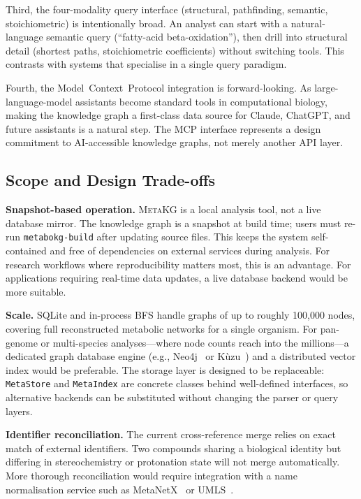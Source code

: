 \documentclass[10pt]{article}
\begin{document}
Third, the four-modality query interface (structural, pathfinding, semantic,
stoichiometric) is intentionally broad. An analyst can start with a
natural-language semantic query (``fatty-acid beta-oxidation''), then drill
into structural detail (shortest paths, stoichiometric coefficients) without
switching tools. This contrasts with systems that specialise in a single query
paradigm.

Fourth, the Model~Context~Protocol integration is forward-looking. As
large-language-model assistants become standard tools in computational biology,
making the knowledge graph a first-class data source for Claude, ChatGPT, and
future assistants is a natural step. The MCP interface represents a design
commitment to AI-accessible knowledge graphs, not merely another API layer.

\subsection{Scope and Design Trade-offs}

\textbf{Snapshot-based operation.} \textsc{MetaKG} is a local analysis tool,
not a live database mirror. The knowledge graph is a snapshot at build time;
users must re-run \texttt{metabokg-build} after updating source files. This
keeps the system self-contained and free of dependencies on external services
during analysis. For research workflows where reproducibility matters most,
this is an advantage. For applications requiring real-time data updates, a
live database backend would be more suitable.

\textbf{Scale.} SQLite and in-process BFS handle graphs of up to roughly
100,000 nodes, covering full reconstructed metabolic networks for a single
organism. For pan-genome or multi-species analyses---where node counts reach
into the millions---a dedicated graph database engine (e.g.,
Neo4j~\citep{neo4j2020} or K\`uzu~\citep{feng2023kuzu}) and a distributed
vector index would be preferable. The storage layer is designed to be
replaceable: \texttt{MetaStore} and \texttt{MetaIndex} are concrete classes
behind well-defined interfaces, so alternative backends can be substituted
without changing the parser or query layers.

\textbf{Identifier reconciliation.} The current cross-reference merge relies
on exact match of external identifiers. Two compounds sharing a biological
identity but differing in stereochemistry or protonation state will not merge
automatically. More thorough reconciliation would require integration with a
name normalisation service such as
MetaNetX~\citep{moretti2021metanetx} or UMLS~\citep{bodenreider2004umls}.
\end{document}
